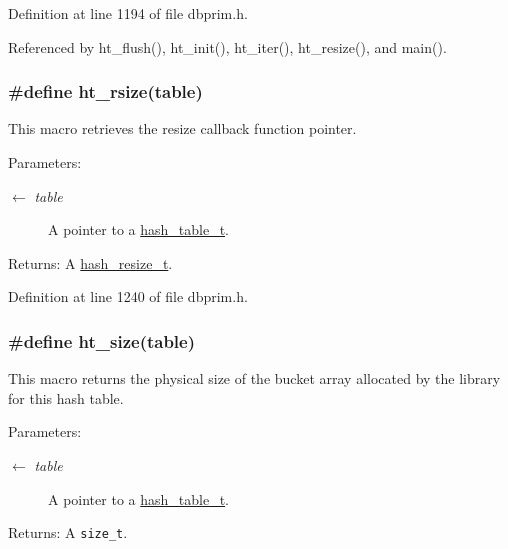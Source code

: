 Definition at line 1194 of file dbprim.h.

Referenced by ht\_\-flush(), ht\_\-init(), ht\_\-iter(), ht\_\-resize(), and main().\hypertarget{group__dbprim__hash_ga33}{
\subsubsection[ht\_\-rsize]{\setlength{\rightskip}{0pt plus 5cm}\#define ht\_\-rsize(table)}}
\label{group__dbprim__hash_ga33}


This macro retrieves the resize callback function pointer.

\begin{Desc}
\item[Parameters:]
\begin{description}
\item[\mbox{$\leftarrow$} {\em table}]A pointer to a \hyperlink{group__dbprim__hash_ga1}{hash\_\-table\_\-t}.\end{description}
\end{Desc}
\begin{Desc}
\item[Returns:]A \hyperlink{group__dbprim__hash_ga6}{hash\_\-resize\_\-t}.\end{Desc}


Definition at line 1240 of file dbprim.h.\hypertarget{group__dbprim__hash_ga35}{
\subsubsection[ht\_\-size]{\setlength{\rightskip}{0pt plus 5cm}\#define ht\_\-size(table)}}
\label{group__dbprim__hash_ga35}


This macro returns the physical size of the bucket array allocated by the library for this hash table.

\begin{Desc}
\item[Parameters:]
\begin{description}
\item[\mbox{$\leftarrow$} {\em table}]A pointer to a \hyperlink{group__dbprim__hash_ga1}{hash\_\-table\_\-t}.\end{description}
\end{Desc}
\begin{Desc}
\item[Returns:]A {\tt size\_\-t}.\end{Desc}


